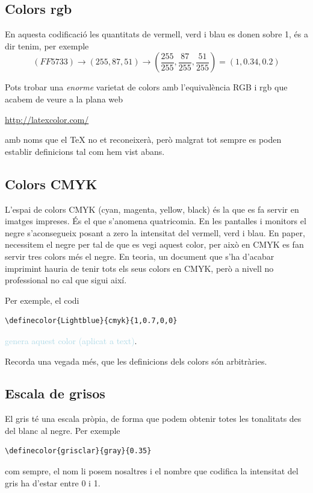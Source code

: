 \documentclass[a4paper,12pt]{article}
\begin{document}
\subsection{Colors rgb}
En aquesta codificació les quantitats de vermell, verd i blau es donen sobre 1, és a dir tenim, per exemple
$$(FF5733)\rightarrow(255,87,51)\rightarrow\left(\frac{255}{255},\frac{87}{255},\frac{51}{255}\right)=(1,0.34,0.2)$$

Pots trobar una \emph{enorme} varietat de colors amb l'equivalència RGB i rgb que acabem de veure a la plana web
\begin{center}
\url{http://latexcolor.com/}
\end{center}

amb noms que el TeX no et reconeixerà, però malgrat tot sempre es poden establir definicions tal com hem vist abans.
\subsection{Colors CMYK}
L'espai de colors CMYK (cyan, magenta, yellow, black) és la que es fa servir en imatges impreses. És el que s'anomena quatricomia. En les pantalles i monitors el negre s'aconsegueix posant a zero la intensitat del vermell, verd i blau. En paper, necessitem el negre per tal de que es vegi aquest color, per això en CMYK es fan servir tres colors més el negre. En teoria, un document que s'ha d'acabar imprimint hauria de tenir tots els seus colors en CMYK, però a nivell no professional no cal que sigui així. 
\bigskip

Per exemple, el codi 

\begin{verbatim}
\definecolor{Lightblue}{cmyk}{1,0.7,0,0}
\end{verbatim}
\textcolor{Lightblue}{genera aquest color (aplicat a text)}.
\bigskip

Recorda una vegada més, que les definicions dels colors són arbitràries.
\subsection{Escala de grisos}
El gris té una escala pròpia, de forma que podem obtenir totes les tonalitats des del blanc al negre. Per exemple

\begin{verbatim}
\definecolor{grisclar}{gray}{0.35}
\end{verbatim}

com sempre, el nom li posem nosaltres i el nombre que codifica la intensitat del gris ha d'estar entre 0 i 1.
\end{document}
